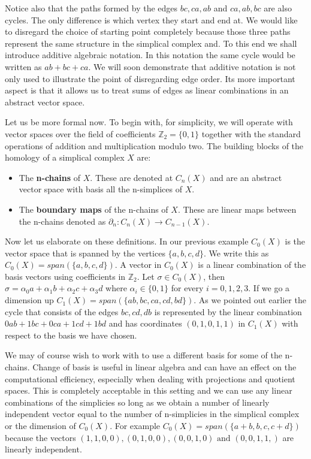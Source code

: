 Notice also that the paths formed by the edges $bc, ca, ab$ and $ca, ab, bc$ are also cycles. The only difference is which vertex they start and end at. We would like to disregard the choice of starting point completely because those three paths represent the same structure in the simplical complex and. To this end we shall introduce additive algebraic notation. In this notation the same cycle would be written as $ab + bc + ca$.  We will soon demonstrate that additive notation is not only used to illustrate the point of disregarding edge order. Its more important aspect is that it allows us to treat sums of edges as linear combinations in an abstract vector space.

Let us be more formal now. To begin with, for simplicity, we will operate with vector spaces over the field of coefficients $\mathbb{Z}_2 = \{0, 1\}$ together with the standard operations of addition and multiplication modulo two. The building blocks of the homology of a simplical complex $X$ are:


\begin{itemize}
    \item The \textbf{n-chains} of $X$. These are denoted at $C_n(X)$ and are an abstract vector space with basis all the n-simplices of $X$.
    \item The \textbf{boundary maps} of the n-chains of $X$. These are linear maps between the n-chains denoted as $\partial_n : C_n(X) \to C_{n-1}(X)$.
\end{itemize}

Now let us elaborate on these definitions. In our previous example $C_0(X)$ is the vector space that is spanned by the vertices $\{a, b, c, d\}$. We write this as $C_0(X) = span(\{a, b, c, d\})$. A vector in $C_0(X)$ is a linear combination of the basis vectors using coefficients in $\mathbb{Z}_2$. Let $\sigma \in C_0(X)$, then $\sigma  = \alpha_0a + \alpha_1b + \alpha_2c + \alpha_3d$ where $\alpha_i \in \{0 ,1\}$ for every $i = 0, 1, 2, 3$. If we go a dimension up $C_1(X) = span(\{ab, bc, ca, cd, bd\})$. As we pointed out earlier the cycle that consists of the edges $bc, cd, db$ is represented by the linear combination $0ab + 1bc + 0ca + 1cd + 1bd$ and has coordinates $(0, 1, 0, 1, 1)$ in $C_1(X)$ with respect to the basis we have chosen.

We may of course wish to work with to use a different basis for some of the n-chains. Change of basis is useful in linear algebra and can have an effect on the computational efficiency, especially when dealing with projections and quotient spaces. This is completely acceptable in this setting and we can use any linear combinations of the simplicies so long as we obtain a number of linearly independent vector equal to the number of n-simplicies in the simplical complex or the dimension of $C_0(X)$. For example $C_0(X) = span(\{a + b, b, c, c + d\})$ because the vectors $(1, 1, 0, 0), (0, 1, 0, 0), (0, 0, 1, 0) \text { and } (0, 0, 1, 1,)$ are linearly independent.

